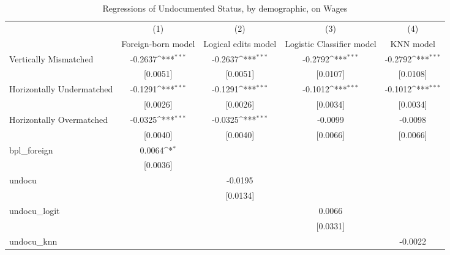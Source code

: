 \begin{table}[htbp]\centering
\def\sym#1{\ifmmode^{#1}\else\(^{#1}\)\fi}
\caption{Regressions of Undocumented Status, by demographic, on Wages}
\begin{tabular}{l*{4}{c}}
\toprule
                    &\multicolumn{1}{c}{(1)}         &\multicolumn{1}{c}{(2)}         &\multicolumn{1}{c}{(3)}         &\multicolumn{1}{c}{(4)}         \\
                    &Foreign-born model         &Logical edits model         &Logistic Classifier model         &   KNN model         \\
\midrule
Vertically Mismatched&     -0.2637\sym{***}&     -0.2637\sym{***}&     -0.2792\sym{***}&     -0.2792\sym{***}\\
                    &    [0.0051]         &    [0.0051]         &    [0.0107]         &    [0.0108]         \\
\addlinespace
Horizontally Undermatched&     -0.1291\sym{***}&     -0.1291\sym{***}&     -0.1012\sym{***}&     -0.1012\sym{***}\\
                    &    [0.0026]         &    [0.0026]         &    [0.0034]         &    [0.0034]         \\
\addlinespace
Horizontally Overmatched&     -0.0325\sym{***}&     -0.0325\sym{***}&     -0.0099         &     -0.0098         \\
                    &    [0.0040]         &    [0.0040]         &    [0.0066]         &    [0.0066]         \\
\addlinespace
bpl\_foreign         &      0.0064\sym{*}  &                     &                     &                     \\
                    &    [0.0036]         &                     &                     &                     \\
\addlinespace
undocu              &                     &     -0.0195         &                     &                     \\
                    &                     &    [0.0134]         &                     &                     \\
\addlinespace
undocu\_logit        &                     &                     &      0.0066         &                     \\
                    &                     &                     &    [0.0331]         &                     \\
\addlinespace
undocu\_knn          &                     &                     &                     &     -0.0022         \\

\end{tabular}
\end{table}
